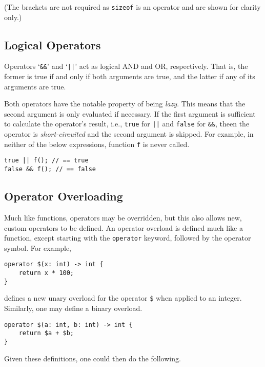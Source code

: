 (The brackets are not required as \texttt{sizeof} is an operator and are shown for clarity only.)

\subsection{Logical Operators}

Operators `\texttt{\&\&}' and `\texttt{||}' act as logical AND and OR, respectively.
That is, the former is true if and only if both arguments are true, and the latter if any of its arguments are true.

Both operators have the notable property of being \textit{lazy}.
This means that the second argument is only evaluated if necessary.
If the first argument is sufficient to calculate the operator's result, i.e., \texttt{true} for \texttt{||} and \texttt{false} for \texttt{\&\&}, theen the operator is \textit{short-circuited} and the second argument is skipped.
For example, in neither of the below expressions, function \texttt{f} is never called.

\begin{lstlisting}[language=CustomLang]
true || f(); // == true
false && f(); // == false
\end{lstlisting}

\subsection{Operator Overloading}

Much like functions, operators may be overridden, but this also allows new, custom operators to be defined.
An operator overload is defined much like a function, except starting with the \texttt{operator} keyword, followed by the operator symbol.
For example,

\begin{lstlisting}[language=CustomLang]
operator $(x: int) -> int {
    return x * 100;
}
\end{lstlisting}

defines a new unary overload for the operator \texttt{\$} when applied to an integer.
Similarly, one may define a binary overload.

\begin{lstlisting}[language=CustomLang]
operator $(a: int, b: int) -> int {
    return $a + $b;
}
\end{lstlisting}

Given these definitions, one could then do the following.

